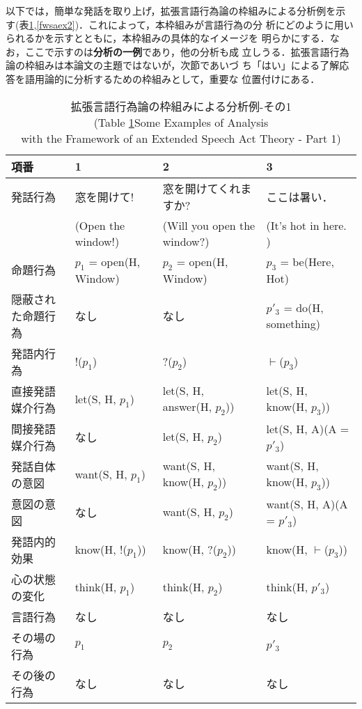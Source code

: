 以下では，簡単な発話を取り上げ，拡張言語行為論の枠組みによる分析例を示
す(表\ref{fwsaex},\ref{fwsaex2})．これによって，本枠組みが言語行為の分
析にどのように用いられるかを示すとともに，本枠組みの具体的なイメージを
明らかにする．なお，ここで示すのは{\bf 分析の一例}であり，他の分析も成
立しうる．拡張言語行為論の枠組みは本論文の主題ではないが，次節であいづ
ち「はい」による了解応答を語用論的に分析するための枠組みとして，重要な
位置付けにある．

\begin{table}[htbp]
\begin{center}
{\footnotesize
\begin{tabular}{l|l|l|l}
項番 & 1 & 2 & 3 \\  \hline
発話行為 & 窓を開けて! & 窓を開けてくれますか? & ここは暑い．\\
& (Open the window!) & (Will you open the window?) & (It's hot in here. )\\	\hline
命題行為 & $p_{1}$ = open(H, Window) & $p_{2}$ = open(H, Window) & $p_{3}$ = be(Here, Hot) \\  \hline
隠蔽された命題行為 & なし & なし & $p'_{3}$ = do(H, something) \\     \hline
発語内行為 & !($p_{1}$) & ?($p_{2}$) & $\vdash$($p_{3}$) \\      \hline
直接発語媒介行為 & let(S, H, $p_{1}$) & let(S, H, answer(H, $p_{2}$)) & let(S, H, know(H, $p_{3}$)) \\  
   \hline
間接発語媒介行為 & なし & let(S, H, $p_{2}$) & let(S, H, A)(A = $p'_{3}$) \\      \hline
発話自体の意図 & want(S, H, $p_{1}$) & want(S, H, know(H, $p_{2}$)) & want(S, H, know(H, $p_{3}$)) \\    \hline
意図の意図 & なし & want(S, H, $p_{2}$) & want(S, H, A)(A = $p'_{3}$)  \\   \hline
発語内的効果 & know(H, !($p_{1}$)) & know(H, ?($p_{2}$)) & know(H, $\vdash$($p_{3}$))\\  \hline
心の状態の変化 & think(H, $p_{1}$) & think(H, $p_{2}$) & think(H, $p'_{3}$)\\    \hline
言語行為 & なし & なし & なし \\        \hline
その場の行為 & $p_{1}$ & $p_{2}$ & $p'_{3}$ \\    \hline
その後の行為 & なし & なし & なし\\
\end{tabular}
}
\caption{拡張言語行為論の枠組みによる分析例-その1\\
(Table \ref{fwsaex}Some Examples of Analysis \\
with the Framework of an Extended Speech Act
Theory - Part 1)}
\label{fwsaex}
\end{center}
\end{table}

